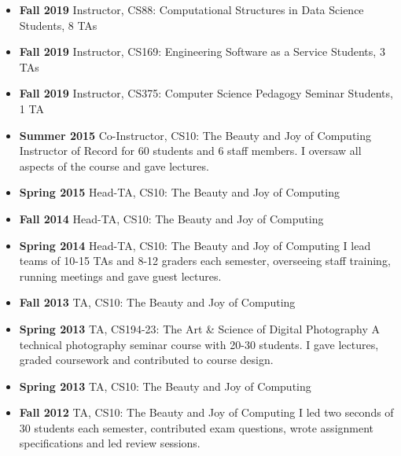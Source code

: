 \begin{itemize}
    \item \textbf{Fall 2019} Instructor, CS88: Computational Structures in Data Science
     Students, 8 TAs
    
    \item \textbf{Fall 2019} Instructor, CS169: Engineering Software as a Service
     Students, 3 TAs
    
    \item \textbf{Fall 2019} Instructor, CS375: Computer Science Pedagogy Seminar
     Students, 1 TA
    
    \item \textbf{Summer 2015} Co-Instructor, CS10: The Beauty and Joy of Computing
    \newline
    \small Instructor of Record for 60 students and 6 staff members. I oversaw all aspects of the course and gave lectures.

    \item \textbf{Spring 2015} Head-TA, CS10: The Beauty and Joy of Computing
    
    \item \textbf{Fall 2014} Head-TA, CS10: The Beauty and Joy of Computing
    
    \item \textbf{Spring 2014} Head-TA, CS10: The Beauty and Joy of Computing
    \newline
    \small I lead teams of 10-15 TAs and 8-12 graders each semester, overseeing staff training, running meetings and gave guest lectures.
    
    \item \textbf{Fall 2013} TA, CS10: The Beauty and Joy of Computing
    
    \item \textbf{Spring 2013} TA, CS194-23: The Art \& Science of Digital Photography
    \newline
    \small A technical photography seminar course with 20-30 students. I gave lectures, graded coursework and contributed to course design.
    
    \item \textbf{Spring 2013} TA, CS10: The Beauty and Joy of Computing
    \item \textbf{Fall 2012} TA, CS10: The Beauty and Joy of Computing
    \newline
    \small I led two seconds of 30 students each semester, contributed exam questions, wrote assignment specifications and led review sessions.
    
\end{itemize}
